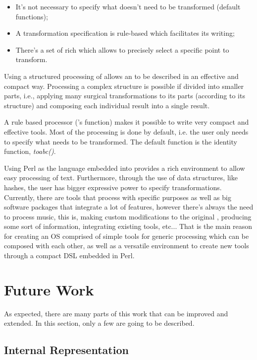 \begin{itemize}
  \item It's not necessary to specify what doesn't need to be transformed (default functions);
  \item A transformation specification is rule-based which facilitates its writing;
  \item There's a set of rich \actuators{} which allows to precisely select a specific point to
  transform.
\end{itemize}

Using a structured processing of \abc{} allows an \abcpt{} to be described in an effective and
compact way.  Processing a complex structure is possible if divided into smaller parts, i.e.,
applying many surgical transformations to its parts (according to its structure) and composing each
individual result into a single result.

A rule based processor (\abcdt{}'s \dt{} function) makes it possible to write very compact and
effective tools. Most of the processing is done by default, i.e. the user only needs to specify what
needs to be transformed. The default function is the identity function, \emph{toabc()}.

Using Perl as the language embedded into \abcdt{} provides a rich environment to allow easy
processing of text. Furthermore, through the use of data structures, like hashes, the user has
bigger expressive power to specify transformations.\\


Currently, there are tools that process \abc{} with specific purposes as well as big software
packages that integrate a lot of features, however there's always the need to process music, this
is, making custom modifications to the original \abc{}, producing some sort of information,
integrating existing tools, etc... That is the main reason for creating an \ac{OS} comprised of
simple tools for generic \abc{} processing which can be composed with each other, as well as a
versatile environment to create new tools through a compact \ac{DSL} embedded in Perl.

\section{Future Work}

As expected, there are many parts of this work that can be improved and extended. In this section,
only a few are going to be described.

\subsection*{Internal Representation}

